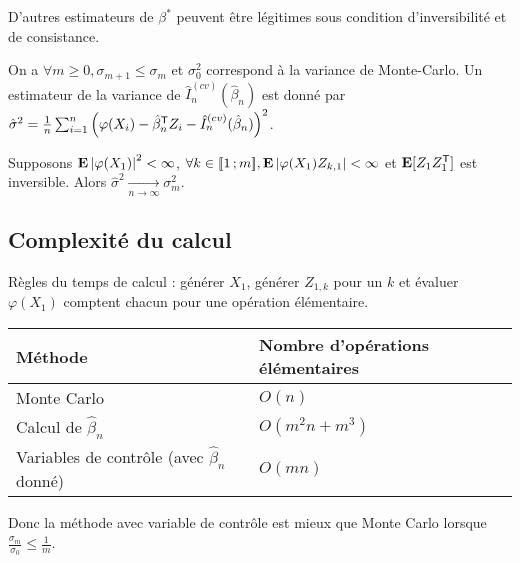 	\begin{rem}
		D'autres estimateurs de $\beta^*$ peuvent être légitimes sous condition d'inversibilité et de consistance.
	\end{rem}
	
	\begin{rem}
		On a $\forall m \geq 0, \sigma_{m + 1} \leq \sigma_m$ et $\sigma_0^2$ correspond à la variance de Monte-Carlo.
		Un estimateur de la variance de $\hat{I}_n^{(cv)}(\hat{\beta}_n)$ est donné par $\hat{\sigma}^2 = \frac{1}{n} \sum_{i = 1}^n \left( \varphi(X_i) - \hat \beta_n^\mathsf{T} Z_i - \hat{I}_n^{(cv)}(\hat{\beta}_n) \right)^2$.
	\end{rem}
	
	\begin{pop}
		Supposons $\mathbf{E} \left\lvert\varphi(X_1)\right\rvert^2 < \infty$, $\forall k \in \mathopen{[\![}1\mathclose{}\mathpunct{};m\mathclose{]\!]}, \mathbf{E} \left\lvert\varphi(X_1) Z_{k,1}\right\rvert < \infty$ et $\mathbf{E}[Z_1 Z_1^\mathsf{T}]$ est inversible.
		Alors $\hat{\sigma}^2 \underset{n \to \infty}{\longrightarrow} \sigma_m^2$.
	\end{pop}


\subsection{Complexité du calcul}

	Règles du temps de calcul : générer $X_1$, générer $Z_{1,k}$ pour un $k$ et évaluer $\varphi(X_1)$ comptent chacun pour une opération élémentaire.
	
	\begin{tabular}{ll}
	Méthode & Nombre d'opérations élémentaires \\
	\hline
	Monte Carlo & $O(n)$ \\
	Calcul de $\hat{\beta}_n$ & $O(m^2 n + m^3)$ \\
	Variables de contrôle (avec $\hat{\beta}_n$ donné) & $O(mn)$
	\end{tabular}
	
	Donc la méthode avec variable de contrôle est mieux que Monte Carlo lorsque $\frac{\sigma_m}{\sigma_0} \leq \frac{1}{m}$.